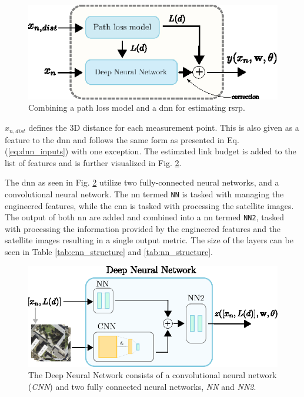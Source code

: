 \begin{figure}
    \centering
    \includegraphics[width=\textwidth]{chapters/part_pathloss/model_aided_paper/combined_model_approach.eps}
    \caption{Combining a path loss model and a \gls{dnn} for estimating \gls{rsrp}.}
    \label{fig:combined_model_approach}
\end{figure}

 $x_{n,dist}$ defines the 3D distance for each measurement point. This is also given as a feature to the \gls{dnn} and follows the same form as presented in Eq. (\ref{eq:dnn_inputs}) with one exception. The estimated link budget is added to the list of features and is further visualized in Fig. \ref{fig:satellite_model_setup_v2}.
 
The \gls{dnn} as seen in Fig. \ref{fig:satellite_model_setup_v2} utilize two fully-connected neural networks, and a convolutional neural network. The \gls{nn} termed \texttt{NN} is tasked with managing the engineered features, while the \gls{cnn} is tasked with processing the satellite images. The output of both \gls{nn} are added and combined into a \gls{nn} termed \texttt{NN2}, tasked with processing the information provided by the engineered features and the satellite images resulting in a single output metric. The size of the layers can be seen in Table \ref{tab:cnn_structure} and \ref{tab:nn_structure}.

\begin{figure}
    \centering
    \includegraphics{chapters/part_pathloss/model_aided_paper/setup_model.eps}
    \caption{The Deep Neural Network consists of a convolutional neural network (\emph{CNN}) and two fully connected neural networks, \emph{NN} and \emph{NN2}.}
    \label{fig:satellite_model_setup_v2}
\end{figure}

